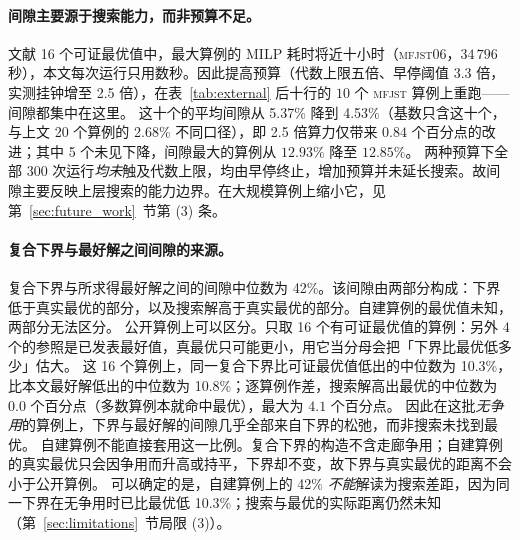 \documentclass[manuscript,screen,review]{acmart}
\newcommand{\NSeeds}{10}
\newcommand{\LBGapMed}{42\%}
\newcommand{\PubNInst}{20}
\newcommand{\PubNOpt}{16}                 %
\newcommand{\PubNMatch}{12}               %
\newcommand{\PubGapMean}{2.68\%}          %
\newcommand{\PubGapMed}{0.00\%}
\newcommand{\PubGapMax}{12.93\%}
\newcommand{\PubGapBig}{9.96\%}           %
\newcommand{\PubGapMeanSeed}{5.29\%}      %
\newcommand{\PubBudgetRatio}{2.5}
\newcommand{\PubGapLoBudget}{5.37\%}      %
\newcommand{\PubGapHiBudget}{4.53\%}      %
\newcommand{\PubBudgetGainPP}{0.84}       %
\newcommand{\PubBudgetNoGain}{5}          %
\newcommand{\PubLBSlack}{10.3\%}          %
\newcommand{\PubLBTotal}{10.8\%}          %
\newcommand{\PubLBResidMed}{0.0}          %
\newcommand{\PubLBResidMax}{4.1}          %
\begin{document}
\begin{table}[t]
\caption{公开基准上的退化比较（删去排他约束，与文献同一问题）。「参照」列的
\textsc{opt} 为 MILP 证明的最优值、\textsc{bk} 为已发表最好值；间隙以 \NSeeds{} 个种子的最优
解计。星号标出最优解与参照值逐位相同者。}
\label{tab:external}
\centering
\small

\end{table}

\paragraph{间隙主要源于搜索能力，而非预算不足。}
文献 \PubNOpt{} 个可证最优值中，最大算例的 MILP 耗时将近十小时（\textsc{mfjst}06，$34\,796$ 秒），本文每次运行只用数秒。因此提高预算（代数上限五倍、早停阈值 $3.3$ 倍，实测挂钟增至 \PubBudgetRatio{} 倍），在表~\ref{tab:external} 后十行的 $10$ 个 \textsc{mfjst} 算例上重跑——间隙都集中在这里。
这十个的平均间隙从 \PubGapLoBudget{} 降到 \PubGapHiBudget{}（基数只含这十个，与上文 \PubNInst{} 个算例的 \PubGapMean{} 不同口径），即 \PubBudgetRatio{} 倍算力仅带来 $\PubBudgetGainPP$ 个百分点的改进；其中 \PubBudgetNoGain{} 个未见下降，间隙最大的算例从 $12.93\%$ 降至 $12.85\%$。
两种预算下全部 $300$ 次运行\emph{均未}触及代数上限，均由早停终止，增加预算并未延长搜索。故间隙主要反映上层搜索的能力边界。在大规模算例上缩小它，见第~\ref{sec:future_work}~节第 (3) 条。

\paragraph{复合下界与最好解之间间隙的来源。}
复合下界与所求得最好解之间的间隙中位数为 \LBGapMed{}。该间隙由两部分构成：下界低于真实最优的部分，以及搜索解高于真实最优的部分。自建算例的最优值未知，两部分无法区分。
公开算例上可以区分。只取 \PubNOpt{} 个有可证最优值的算例：另外 $4$ 个的参照是已发表最好值，真最优只可能更小，用它当分母会把「下界比最优低多少」估大。
这 \PubNOpt{} 个算例上，同一复合下界比可证最优值低出的中位数为 \PubLBSlack{}，比本文最好解低出的中位数为 \PubLBTotal{}；逐算例作差，搜索解高出最优的中位数为 $\PubLBResidMed$ 个百分点（多数算例本就命中最优），最大为 $\PubLBResidMax$ 个百分点。
因此在这批\emph{无争用}的算例上，下界与最好解的间隙几乎全部来自下界的松弛，而非搜索未找到最优。
自建算例不能直接套用这一比例。复合下界的构造不含走廊争用；自建算例的真实最优只会因争用而升高或持平，下界却不变，故下界与真实最优的距离不会小于公开算例。
可以确定的是，自建算例上的 \LBGapMed{} \emph{不能}解读为搜索差距，因为同一下界在无争用时已比最优低 \PubLBSlack{}；搜索与最优的实际距离仍然未知（第~\ref{sec:limitations}~节局限 (3)）。
\end{document}
